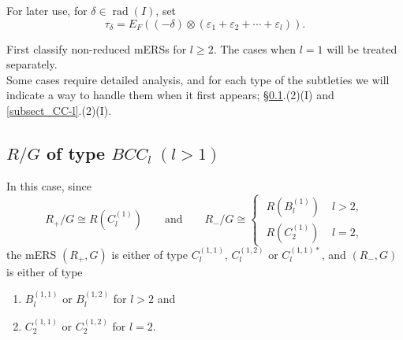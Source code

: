 \documentclass[11pt]{amsart}
\newcommand{\rad}{\operatorname{rad}}
\newcommand{\vep}{\varepsilon}
\begin{document}
For later use, for $\delta \in \rad(I)$, set 
\begin{equation}\label{def_translation}
\tau_\delta=E_F\left((-\delta)\otimes (\vep_1+\vep_2+\cdots +\vep_l)\right).
\end{equation}

First classify non-reduced mERSs for $l\geq 2$. The cases when $l=1$ will be treated separately. \\

Some cases require detailed analysis, and for each type of the subtleties we will indicate a way to handle them when it first appears; \S \ref{subsubsect_BCC-l}.(2)(I) and \ref{subsect_CC-l}.(2)(I).



\subsection {${R/G}$ of type $BCC_l\; (l> 1)$}\label{subsubsect_BCC-l}
In this case, since 
\[ R_+/G \cong R(C_l^{(1)}) \qquad \text{and}\qquad R_-/G \cong \begin{cases} \; R(B_l^{(1)}) \; &l>2, \\ \; R(C_2^{(1)})\; &l=2, \end{cases} 
\]
the mERS $(R_+,G)$ is either of type $C_l^{(1,1)}, \, C_l^{(1,2)}$ or $C_l^{(1,1)\ast}$, and
$(R_-,G)$ is either of type
\begin{enumerate}
\item $B_l^{(1,1)}$ or $B_l^{(1,2)}$ for $l>2$ and
\item $C_2^{(1,1)}$ or $C_2^{(1,2)}$ for $l=2$.
\end{enumerate}
\vskip 0.1in

 \quad \\
\end{document}
